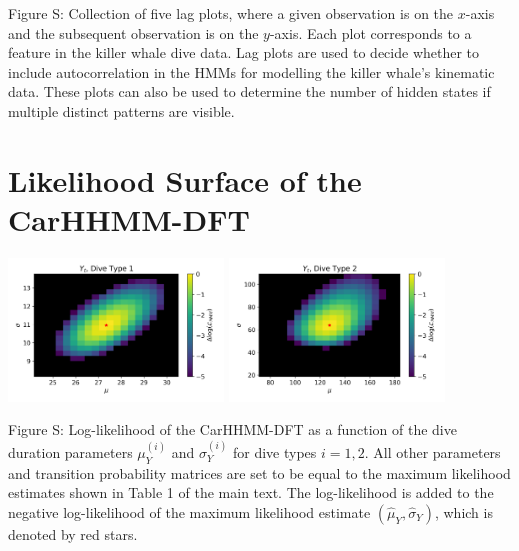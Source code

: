 \documentclass{article}
\begin{document}
        \noindent Figure S: Collection of five lag plots, where a given observation is on the $x$-axis and the subsequent observation is on the $y$-axis. Each plot corresponds to a feature in the killer whale dive data. Lag plots are used to decide whether to include autocorrelation in the HMMs for modelling the killer whale's kinematic data. These plots can also be used to determine the number of hidden states if multiple distinct patterns are visible. 
        \addtocounter{fignum}{1}
        
        \newpage
        
    \section{Likelihood Surface of the CarHHMM-DFT}
    
        \begin{center}
        \includegraphics[width=2.25in]{../Plots/2019/20190902-182840-CATs_OB_1_0_267_CarHHMM2_coarse-theta-likelihood-dive_duration-1.png}
        \includegraphics[width=2.25in]{../Plots/2019/20190902-182840-CATs_OB_1_0_267_CarHHMM2_coarse-theta-likelihood-dive_duration-2.png}
        \end{center}
        
        \noindent Figure S: Log-likelihood of the CarHHMM-DFT as a function of the dive duration parameters $\mu_Y^{(i)}$ and $\sigma_Y^{(i)}$ for dive types $i = 1,2$. All other parameters and transition probability matrices are set to be equal to the maximum likelihood estimates shown in Table 1 of the main text. The log-likelihood is added to the negative log-likelihood of the maximum likelihood estimate $(\hat \mu_Y,\hat \sigma_Y)$, which is denoted by red stars.
        \addtocounter{fignum}{1}
        
\end{document}
